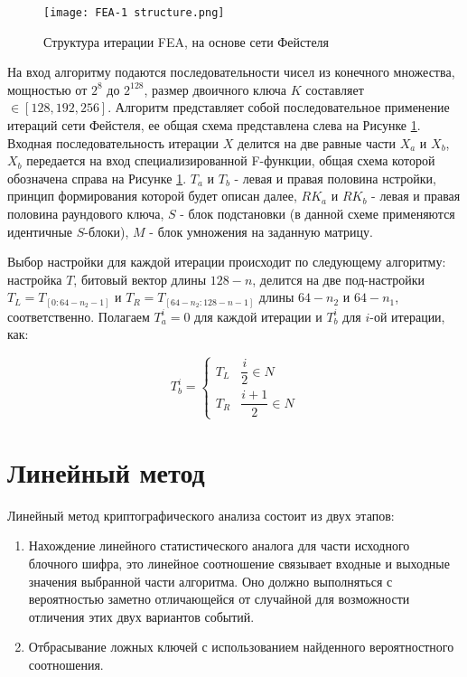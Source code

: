 \documentclass[utf8x, 14pt]{G7-32} %
\begin{document}
\begin{figure}[h!]
	\texttt{[image: FEA-1 structure.png]}
	\caption{Структура итерации FEA, на основе сети Фейстеля}
	\label{fig:fea_structure}
\end{figure}

На вход алгоритму подаются последовательности чисел из конечного множества, мощностью от $2^8$ до $2^{128}$, размер двоичного ключа $K$ составляет $\in [ 128, 192, 256 ]$. Алгоритм представляет собой последовательное применение итераций сети Фейстеля, ее общая схема представлена слева на Рисунке \ref{fig:fea_structure}. Входная последовательность итерации $X$ делится на две равные части $X_a$ и $ X_b$, $X_b$ передается на вход специализированной F-функции, общая схема которой обозначена справа на Рисунке \ref{fig:fea_structure}. $T_a$ и $T_b$ - левая и правая половина нстройки, принцип формирования которой будет описан далее, $RK_a$ и $RK_b$ - левая и правая половина раундового ключа, $S$ - блок подстановки (в данной схеме применяются идентичные $S$-блоки), $M$ - блок умножения на заданную матрицу.


Выбор настройки для каждой итерации происходит по следующему алгоритму: настройка $T$, битовый вектор длины $128-n$, делится на две под-настройки $T_L = T_{ [ 0:64-n_2-1 ] }$ и $T_R=T_{ [ 64-n_2:128-n-1 ] }$ длины $64-n_2$ и $64-n_1$, соответственно. Полагаем $T_a^i=0$ для каждой итерации и $T_b^i$ для $i$-ой итерации, как:

$$ T_b^i =
\begin{cases}
T_L & \dfrac{i}{2} \in N \\
T_R & \dfrac{i+1}{2} \in N
\end{cases} $$

\section{Линейный метод}

Линейный метод криптографического анализа состоит из двух этапов: 
\begin{enumerate}
    \item Нахождение линейного статистического аналога для части исходного блочного шифра, это линейное соотношение связывает входные и выходные значения выбранной части алгоритма. Оно должно выполняться с вероятностью заметно отличающейся от случайной для возможности отличения этих двух вариантов событий.
    \item Отбрасывание ложных ключей с использованием найденного вероятностного соотношения.
\end{enumerate}
\end{document}
